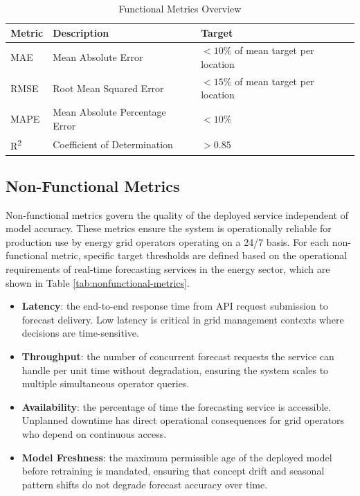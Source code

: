 \documentclass[12pt, a4paper]{report}
\begin{document}
\begin{table}[!h]
    \centering
    \caption{Functional Metrics Overview}
    \begin{tabular}{llp{4cm}}
        \toprule
        \textbf{Metric} & \textbf{Description} & \textbf{Target} \\
        \midrule
        MAE  & Mean Absolute Error              & $<10\%$ of mean target per location \\
        RMSE & Root Mean Squared Error          & $<15\%$ of mean target per location \\
        MAPE & Mean Absolute Percentage Error   & $<10\%$ \\
        R\textsuperscript{2} & Coefficient of Determination & $>0.85$ \\
        \bottomrule
    \end{tabular}
    \label{tab:functional-metrics}
\end{table}

\subsection{Non-Functional Metrics}

Non-functional metrics govern the quality of the deployed service independent of model accuracy.
These metrics ensure the system is operationally reliable for production use by energy grid operators operating on a 24/7 basis.
For each non-functional metric, specific target thresholds are defined based on the operational requirements of real-time forecasting services in the energy sector, which are shown in Table \ref{tab:nonfunctional-metrics}.

\begin{itemize}
    \item \textbf{Latency}: the end-to-end response time from API request submission to forecast delivery. Low latency is critical in grid management contexts where decisions are time-sensitive.
    \item \textbf{Throughput}: the number of concurrent forecast requests the service can handle per unit time without degradation, ensuring the system scales to multiple simultaneous operator queries.
    \item \textbf{Availability}: the percentage of time the forecasting service is accessible. Unplanned downtime has direct operational consequences for grid operators who depend on continuous access.
    \item \textbf{Model Freshness}: the maximum permissible age of the deployed model before retraining is mandated, ensuring that concept drift and seasonal pattern shifts do not degrade forecast accuracy over time.
\end{itemize}
\end{document}
